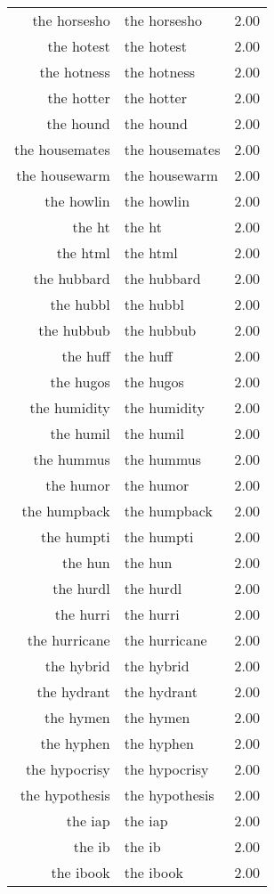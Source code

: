 \begin{table}[ht]
\begin{tabular}{rlr}
  the horsesho & the horsesho & 2.00 \\ 
  the hotest & the hotest & 2.00 \\ 
  the hotness & the hotness & 2.00 \\ 
  the hotter & the hotter & 2.00 \\ 
  the hound & the hound & 2.00 \\ 
  the housemates & the housemates & 2.00 \\ 
  the housewarm & the housewarm & 2.00 \\ 
  the howlin & the howlin & 2.00 \\ 
  the ht & the ht & 2.00 \\ 
  the html & the html & 2.00 \\ 
  the hubbard & the hubbard & 2.00 \\ 
  the hubbl & the hubbl & 2.00 \\ 
  the hubbub & the hubbub & 2.00 \\ 
  the huff & the huff & 2.00 \\ 
  the hugos & the hugos & 2.00 \\ 
  the humidity & the humidity & 2.00 \\ 
  the humil & the humil & 2.00 \\ 
  the hummus & the hummus & 2.00 \\ 
  the humor & the humor & 2.00 \\ 
  the humpback & the humpback & 2.00 \\ 
  the humpti & the humpti & 2.00 \\ 
  the hun & the hun & 2.00 \\ 
  the hurdl & the hurdl & 2.00 \\ 
  the hurri & the hurri & 2.00 \\ 
  the hurricane & the hurricane & 2.00 \\ 
  the hybrid & the hybrid & 2.00 \\ 
  the hydrant & the hydrant & 2.00 \\ 
  the hymen & the hymen & 2.00 \\ 
  the hyphen & the hyphen & 2.00 \\ 
  the hypocrisy & the hypocrisy & 2.00 \\ 
  the hypothesis & the hypothesis & 2.00 \\ 
  the iap & the iap & 2.00 \\ 
  the ib & the ib & 2.00 \\ 
  the ibook & the ibook & 2.00 \\ 

\end{tabular}
\end{table}
